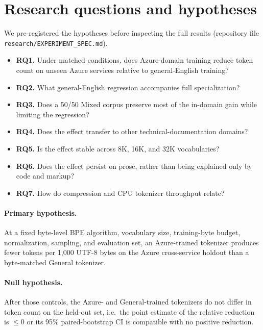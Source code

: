 \section{Research questions and hypotheses}
\label{sec:rq}

We pre-registered the hypotheses before inspecting the full results (repository
file \texttt{research/EXPERIMENT\_SPEC.md}).

\begin{itemize}
  \item \textbf{RQ1.} Under matched conditions, does Azure-domain training reduce
  token count on unseen Azure services relative to general-English training?
  \item \textbf{RQ2.} What general-English regression accompanies full
  specialization?
  \item \textbf{RQ3.} Does a 50/50 Mixed corpus preserve most of the in-domain
  gain while limiting the regression?
  \item \textbf{RQ4.} Does the effect transfer to other technical-documentation
  domains?
  \item \textbf{RQ5.} Is the effect stable across 8K, 16K, and 32K vocabularies?
  \item \textbf{RQ6.} Does the effect persist on prose, rather than being explained
  only by code and markup?
  \item \textbf{RQ7.} How do compression and CPU tokenizer throughput relate?
\end{itemize}

\paragraph{Primary hypothesis.} At a fixed byte-level BPE algorithm, vocabulary
size, training-byte budget, normalization, sampling, and evaluation set, an
Azure-trained tokenizer produces fewer tokens per 1{,}000 UTF-8 bytes on the Azure
cross-service holdout than a byte-matched General tokenizer.

\paragraph{Null hypothesis.} After those controls, the Azure- and General-trained
tokenizers do not differ in token count on the held-out set, i.e.\ the point
estimate of the relative reduction is $\le 0$ or its 95\% paired-bootstrap CI is
compatible with no positive reduction.
